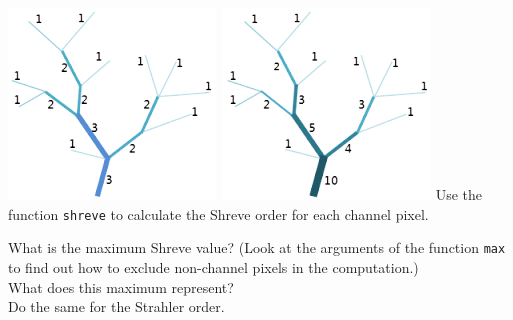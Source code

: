 \documentclass[twocolumn, 10pt, a4paper]{article}
\newenvironment{PC_prac_environment}{
\def\Q{\noindent \color{Gray}\rule[-0.1cm]{\columnwidth}{1.5pt}  \color{black} } \let\ques\Q 
\def\nQ{\noindent \color{black} } \let\ques\nQ 
\def\E{\color{Gray}\rule[0.3cm]{\columnwidth}{1.5pt} \color{black}} \let\ques\E }
\newcommand{\A}[2] { \ifthenelse{\boolean{showanswer}} {\noindent \color{cyan}{#2}\color{black}} {\multido{}{#1}{\noindent \color{light-gray}\hrulefill\\} } }
\begin{document}
\begin{PC_prac_environment}
\hbox{\includegraphics[width=0.5\columnwidth]{Strahler.png} \includegraphics[width=0.5\columnwidth]{Shreve.png}}\vspace{4mm}
\noindent Use the function \texttt{shreve} to calculate the Shreve order for each channel pixel. 

\Q What is the maximum Shreve value? (Look at the arguments of the function \texttt{max} to find out how to exclude non-channel pixels in the computation.)\\
\nQ What does this maximum represent? \\
\E
Do the same for the Strahler order.


\end{PC_prac_environment}
\end{document}
